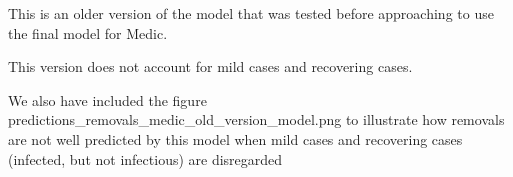 This is an older version of the model that was tested before approaching to use the final model for Medic. 

This version does not account for mild cases and recovering cases. 

We also have included the figure predictions_removals_medic_old_version_model.png to illustrate how removals are not well predicted by this model when mild cases 
and recovering cases (infected, but not infectious) are disregarded
